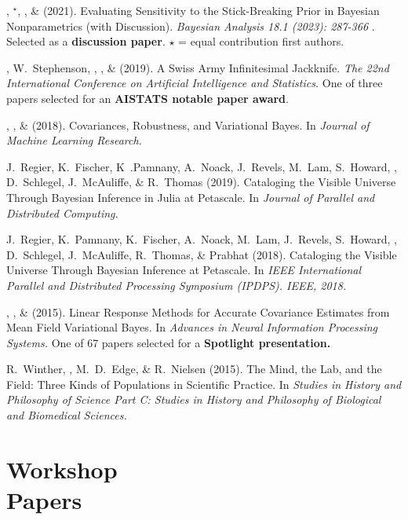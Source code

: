 \mestar, \runjing{}$^\star$, \mike, \& \tamara (2021).
Evaluating Sensitivity to the Stick-Breaking Prior in Bayesian Nonparametrics (with Discussion).
\emph{Bayesian Analysis 18.1 (2023): 287-366} . 
Selected as a \textbf{discussion paper}.
$\star$ = equal contribution first authors.

\me, W.~Stephenson, \runjing, \mike, \& \tamara (2019).  A Swiss Army Infinitesimal
Jackknife.  \emph{The 22nd International Conference on Artificial Intelligence
and Statistics.} 
One of three papers selected for an \textbf{AISTATS notable paper award}.


\me, \tamara, \& \mike (2018).  Covariances, Robustness, and Variational Bayes.
In \emph{Journal of Machine Learning Research.}

J.~Regier, K.~Fischer, K~.Pamnany, A.~Noack, J.~Revels, M.~Lam, S.~Howard,
\me, D.~Schlegel, J.~McAuliffe, \& R.~Thomas (2019). Cataloging the Visible
Universe Through Bayesian Inference in Julia at Petascale. In \emph{Journal of
Parallel and Distributed Computing.}

J.~Regier, K.~Pamnany, K.~Fischer, A.~Noack, M.~Lam, J.~Revels, S.~Howard, \me,
D.~Schlegel, J.~McAuliffe, R.~Thomas, \& Prabhat (2018).  Cataloging the Visible
Universe Through Bayesian Inference at Petascale.  In \emph{IEEE International
Parallel and Distributed Processing Symposium (IPDPS). IEEE, 2018.}

\me, \tamara, \& \mike (2015). Linear Response Methods for Accurate Covariance
Estimates from Mean Field Variational Bayes. In \emph{Advances in Neural
Information Processing Systems.}
One of 67 papers selected for a \textbf{Spotlight presentation.}

R.~Winther, \me, M.~D.~Edge, \& R.~Nielsen (2015).  The Mind, the Lab, and the
Field: Three Kinds of Populations in Scientific Practice.  In \emph{Studies in
History and Philosophy of Science Part C: Studies in History and Philosophy of
Biological and Biomedical Sciences.}


\section{\sc Workshop \\ Papers}

